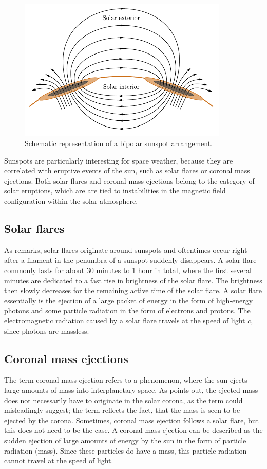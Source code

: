 \documentclass[a4paper,12pt]{report}
\begin{document}
\begin{figure}[h]
\centering
\includegraphics[width=10cm]{figures/bipolarsunspots.pdf}
\caption{Schematic representation of a bipolar sunspot arrangement.}
\label{fig:bipolarsunspots}
\end{figure}
Sunspots are particularly interesting for space weather, because they are correlated with eruptive events of the sun, such as solar flares or coronal mass ejections. Both solar flares and coronal mass ejections belong to the category of solar eruptions, which are are tied to instabilities in the magnetic field configuration within the solar atmosphere.

\subsection{Solar flares}
As \cite[p.432]{Stix.2002} remarks, solar flares originate around sunspots and oftentimes occur right after a filament in the penumbra of a sunspot suddenly disappears. A solar flare commonly lasts for about 30 minutes to 1 hour in total, where the first several minutes are dedicated to a fast rise in brightness of the solar flare. The brightness then slowly decreases for the remaining active time of the solar flare. A solar flare essentially is the ejection of a large packet of energy in the form of high-energy photons and some particle radiation in the form of electrons and protons. The electromagnetic radiation caused by a solar flare travels at the speed of light $c$, since photons are massless.

\subsection{Coronal mass ejections}
The term coronal mass ejection refers to a phenomenon, where the sun ejects large amounts of mass into interplanetary space. As \cite[p.436]{Stix.2002} points out, the ejected mass does not necessarily have to originate in the solar corona, as the term could misleadingly suggest; the term reflects the fact, that the mass is seen to be ejected by the corona. Sometimes, coronal mass ejection follows a solar flare, but this does not need to be the case. A coronal mass ejection can be described as the sudden ejection of large amounts of energy by the sun in the form of particle radiation (mass). Since these particles do have a mass, this particle radiation cannot travel at the speed of light.
\end{document}
